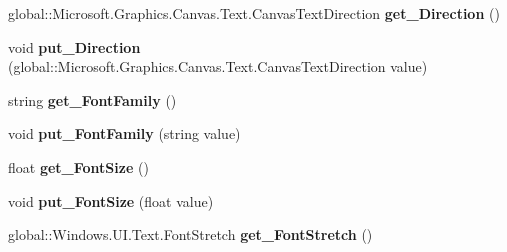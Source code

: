 \begin{DoxyCompactItemize}
global\+::\+Microsoft.\+Graphics.\+Canvas.\+Text.\+Canvas\+Text\+Direction {\bfseries get\+\_\+\+Direction} ()
\item 
\mbox{\label{interface_microsoft_1_1_graphics_1_1_canvas_1_1_text_1_1_i_canvas_text_format_ae3d774c44911dc8c0de1180ace93d9a4}} 
void {\bfseries put\+\_\+\+Direction} (global\+::\+Microsoft.\+Graphics.\+Canvas.\+Text.\+Canvas\+Text\+Direction value)
\item 
\mbox{\label{interface_microsoft_1_1_graphics_1_1_canvas_1_1_text_1_1_i_canvas_text_format_a8fe1529664d2dfc46f799ee6b186b187}} 
string {\bfseries get\+\_\+\+Font\+Family} ()
\item 
\mbox{\label{interface_microsoft_1_1_graphics_1_1_canvas_1_1_text_1_1_i_canvas_text_format_a69caecba006870d1082bccc391fe1ffd}} 
void {\bfseries put\+\_\+\+Font\+Family} (string value)
\item 
\mbox{\label{interface_microsoft_1_1_graphics_1_1_canvas_1_1_text_1_1_i_canvas_text_format_a2179dacf6c7f28ebcfd811d8b0b3c56b}} 
float {\bfseries get\+\_\+\+Font\+Size} ()
\item 
\mbox{\label{interface_microsoft_1_1_graphics_1_1_canvas_1_1_text_1_1_i_canvas_text_format_a8362a30e758e319e0a809612f7ae588c}} 
void {\bfseries put\+\_\+\+Font\+Size} (float value)
\item 
\mbox{\label{interface_microsoft_1_1_graphics_1_1_canvas_1_1_text_1_1_i_canvas_text_format_a2d893747a0b7e4f012077b9c30b7a813}} 
global\+::\+Windows.\+U\+I.\+Text.\+Font\+Stretch {\bfseries get\+\_\+\+Font\+Stretch} ()
\item 
\mbox{\label{interface_microsoft_1_1_graphics_1_1_canvas_1_1_text_1_1_i_canvas_text_format_a99394a0d03712bc7ff30779ce63c9f56}} 

\end{DoxyCompactItemize}
